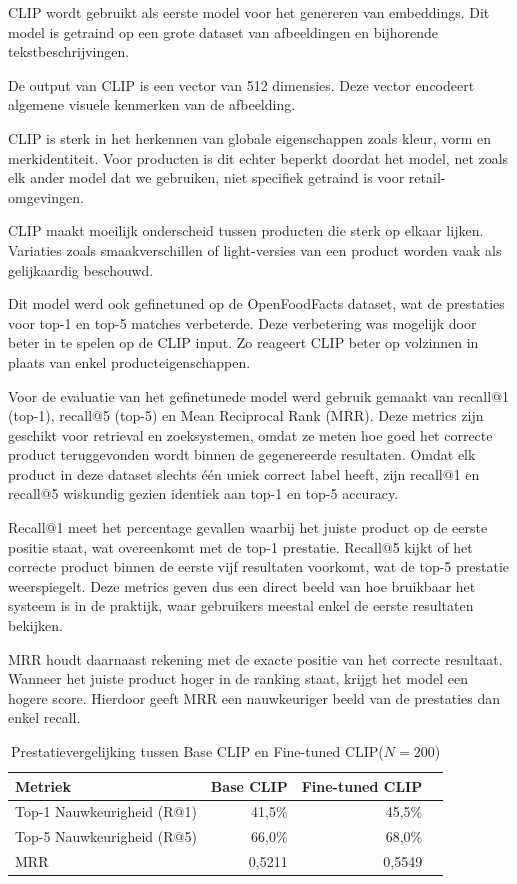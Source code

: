CLIP wordt gebruikt als eerste model voor het genereren van embeddings. Dit model is getraind op een grote dataset van afbeeldingen en bijhorende tekstbeschrijvingen.

De output van CLIP is een vector van 512 dimensies. Deze vector encodeert algemene visuele kenmerken van de afbeelding.

CLIP is sterk in het herkennen van globale eigenschappen zoals kleur, vorm en merkidentiteit. Voor producten is dit echter beperkt doordat het model, net zoals elk ander model dat we gebruiken, niet specifiek getraind is voor retail-omgevingen.

CLIP maakt moeilijk onderscheid tussen producten die sterk op elkaar lijken. Variaties zoals smaakverschillen of light-versies van een product worden vaak als gelijkaardig beschouwd.

Dit model werd ook gefinetuned op de OpenFoodFacts dataset, wat de prestaties voor top-1 en top-5 matches verbeterde. Deze verbetering was mogelijk door beter in te spelen op de CLIP input. Zo reageert CLIP beter op volzinnen in plaats van enkel producteigenschappen.

Voor de evaluatie van het gefinetunede model werd gebruik gemaakt van recall@1 (top-1), recall@5 (top-5) en Mean Reciprocal Rank (MRR). Deze metrics zijn geschikt voor retrieval en zoeksystemen, omdat ze meten hoe goed het correcte product teruggevonden wordt binnen de gegenereerde resultaten. Omdat elk product in deze dataset slechts één uniek correct label heeft, zijn recall@1 en recall@5 wiskundig gezien identiek aan top-1 en top-5 accuracy.

Recall@1 meet het percentage gevallen waarbij het juiste product op de eerste positie staat, wat overeenkomt met de top-1 prestatie. Recall@5 kijkt of het correcte product binnen de eerste vijf resultaten voorkomt, wat de top-5 prestatie weerspiegelt. Deze metrics geven dus een direct beeld van hoe bruikbaar het systeem is in de praktijk, waar gebruikers meestal enkel de eerste resultaten bekijken.

MRR houdt daarnaast rekening met de exacte positie van het correcte resultaat. Wanneer het juiste product hoger in de ranking staat, krijgt het model een hogere score. Hierdoor geeft MRR een nauwkeuriger beeld van de prestaties dan enkel recall.

\begin{table}[H]
\centering
\caption{Prestatievergelijking tussen Base CLIP en Fine-tuned CLIP($N=200$)}
\label{tab:clip_evaluatie}
\begin{tabular}{lrrr}
\toprule
\textbf{Metriek} & \textbf{Base CLIP} & \textbf{Fine-tuned CLIP} \\
\midrule
Top-1 Nauwkeurigheid (R@1) & 41,5\% & 45,5\% \\
Top-5 Nauwkeurigheid (R@5) & 66,0\% & 68,0\% \\
MRR                        & 0,5211 & 0,5549 \\
\bottomrule
\end{tabular}
\end{table}

